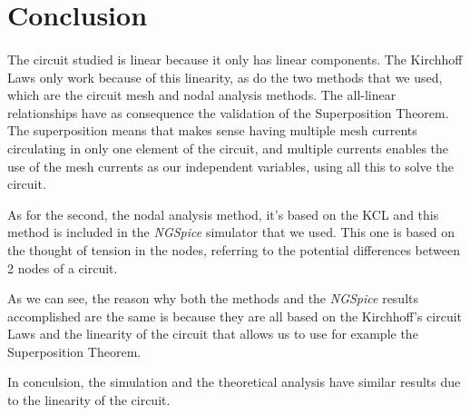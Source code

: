 \section{Conclusion}
\label{sec:conclusion}
\paragraph{}
\par The circuit studied is linear because it only has linear components. The Kirchhoff Laws only work because of this linearity, as do the two methods that we used, which are the circuit mesh and nodal analysis methods. The all-linear relationships have as consequence the validation of the Superposition Theorem. The superposition means that makes sense having multiple mesh currents circulating in only one element of the circuit, and multiple currents enables the use of the mesh currents as our independent variables, using all this to solve the circuit. 
\par As for the second, the nodal analysis method, it's based on the KCL and this method is included in the \textit{NGSpice} simulator that we used. This one is based on the thought of tension in the nodes, referring to the potential differences between 2 nodes of a circuit.
\par As we can see, the reason why both the methods and the \textit{NGSpice} results accomplished are the same is because they are all based on the Kirchhoff's circuit Laws and the linearity of the circuit that allows us to use for example the Superposition Theorem.
\par In conculsion, the simulation and the theoretical analysis have similar results due to the linearity of the circuit.
